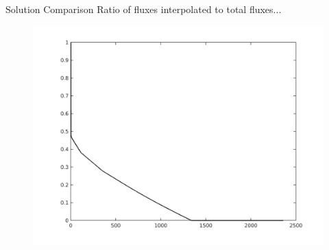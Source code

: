 \documentclass{beamer}
\begin{document}
\begin{frame}{Solution Comparison}
  Ratio of fluxes interpolated to total fluxes...
  \begin{figure}
    \center
    \includegraphics[scale=0.4]{flux_ratio.png}
  \end{figure}
\end{frame}
\end{document}
